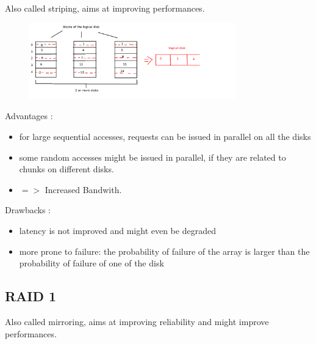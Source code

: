 \documentclass[a4paper,10pt]{report}
\newlength{\larg}
\begin{document}
Also called striping, aims at improving performances.
\begin{figure}[h!]
  \begin{center}
    \includegraphics[width=0.8\textwidth]{raid_0_chunks.png}
    \caption{}
  \end{center}
\end{figure}

Advantages :

\begin{itemize}
  \item for large sequential accesses, requests can be issued in parallel on all the disks
  \item some random accesses might be issued in parallel, if they are related to chunks on different disks.
  \item $=>$ Increased Bandwith.
\end{itemize}

Drawbacks :

\begin{itemize}
  \item latency is not improved and might even be degraded
  \item more prone to failure: the probability of failure of the array is larger than the probability of failure of one of the disk
\end{itemize}

\subsection{RAID 1}

Also called mirroring, aims at improving reliability and might improve performances.
\end{document}
